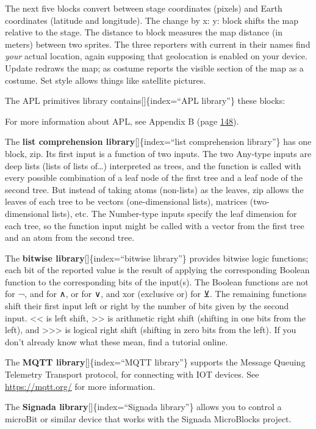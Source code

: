 \documentclass[
  letterpaper,
]{book}
\begin{document}
The next five blocks convert between stage coordinates (pixels) and
Earth coordinates (latitude and longitude). The change by x: y: block
shifts the map relative to the stage. The distance to block measures the
map distance (in meters) between two sprites. The three reporters with
current in their names find \emph{your} actual location, again supposing
that geolocation is enabled on your device. Update redraws the map; as
costume reports the visible section of the map as a costume. Set style
allows things like satellite pictures.

The APL primitives library contains{[}{]}\{index=``APL library''\} these
blocks:

For more information about APL, see Appendix B (page
\hyperref[appendix-b.-apl-features]{148}).

The \textbf{list comprehension library}{[}{]}\{index=``list
comprehension library''\} has one block, zip. Its first input is a
function of two inputs. The two Any-type inputs are deep lists (lists of
lists of\ldots) interpreted as trees, and the function is called with
every possible combination of a leaf node of the first tree and a leaf
node of the second tree. But instead of taking atoms (non-lists) as the
leaves, zip allows the leaves of each tree to be vectors
(one-dimensional lists), matrices (two-dimensional lists), etc. The
Number-type inputs specify the leaf dimension for each tree, so the
function input might be called with a vector from the first tree and an
atom from the second tree.

The \textbf{bitwise library}{[}{]}\{index=``bitwise library''\} provides
bitwise logic functions; each bit of the reported value is the result of
applying the corresponding Boolean function to the corresponding bits of
the input(s). The Boolean functions are not for ¬, and for ∧, or for ∨,
and xor (exclusive or) for ⊻. The remaining functions shift their first
input left or right by the number of bits given by the second input.
\textless\textless{} is left shift, \textgreater\textgreater{} is
arithmetic right shift (shifting in one bits from the left), and
\textgreater\textgreater\textgreater{} is logical right shift (shifting
in zero bits from the left). If you don't already know what these mean,
find a tutorial online.

The \textbf{MQTT library}{[}{]}\{index=``MQTT library''\} supports the
Message Queuing Telemetry Transport protocol, for connecting with IOT
devices. See \url{https://mqtt.org/} for more information.

The \textbf{Signada library}{[}{]}\{index=``Signada library''\} allows
you to control a microBit or similar device that works with the Signada
MicroBlocks project.
\end{document}
